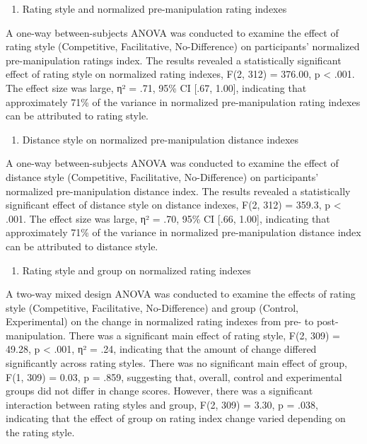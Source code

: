 \documentclass[
  letterpaper,
  DIV=11,
  numbers=noendperiod]{scrartcl}
\providecommand{\tightlist}{%
  \setlength{\itemsep}{0pt}\setlength{\parskip}{0pt}}\usepackage{longtable,booktabs,array}
\begin{document}
\begin{enumerate}
\def\labelenumi{\arabic{enumi}.}
\setcounter{enumi}{4}
\tightlist
\item
  Rating style and normalized pre-manipulation rating indexes
\end{enumerate}

A one-way between-subjects ANOVA was conducted to examine the effect of
rating style (Competitive, Facilitative, No-Difference) on participants'
normalized pre-manipulation ratings index. The results revealed a
statistically significant effect of rating style on normalized rating
indexes, F(2, 312) = 376.00, p \textless{} .001. The effect size was
large, η² = .71, 95\% CI {[}.67, 1.00{]}, indicating that approximately
71\% of the variance in normalized pre-manipulation rating indexes can
be attributed to rating style.

\begin{enumerate}
\def\labelenumi{\arabic{enumi}.}
\setcounter{enumi}{5}
\tightlist
\item
  Distance style on normalized pre-manipulation distance indexes
\end{enumerate}

A one-way between-subjects ANOVA was conducted to examine the effect of
distance style (Competitive, Facilitative, No-Difference) on
participants' normalized pre-manipulation distance index. The results
revealed a statistically significant effect of distance style on
distance indexes, F(2, 312) = 359.3, p \textless{} .001. The effect size
was large, η² = .70, 95\% CI {[}.66, 1.00{]}, indicating that
approximately 71\% of the variance in normalized pre-manipulation
distance index can be attributed to distance style.

\begin{enumerate}
\def\labelenumi{\arabic{enumi}.}
\setcounter{enumi}{6}
\tightlist
\item
  Rating style and group on normalized rating indexes
\end{enumerate}

A two-way mixed design ANOVA was conducted to examine the effects of
rating style (Competitive, Facilitative, No-Difference) and group
(Control, Experimental) on the change in normalized rating indexes from
pre- to post-manipulation. There was a significant main effect of rating
style, F(2, 309) = 49.28, p \textless{} .001, η² = .24, indicating that
the amount of change differed significantly across rating styles. There
was no significant main effect of group, F(1, 309) = 0.03, p = .859,
suggesting that, overall, control and experimental groups did not differ
in change scores. However, there was a significant interaction between
rating styles and group, F(2, 309) = 3.30, p = .038, indicating that the
effect of group on rating index change varied depending on the rating
style.
\end{document}
